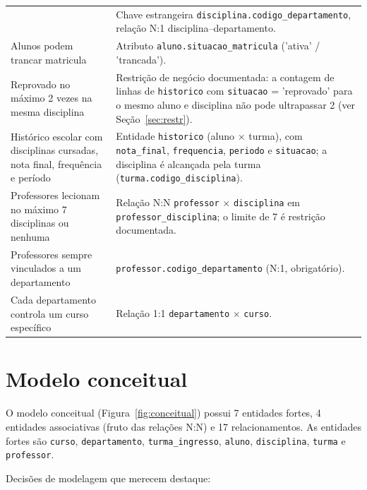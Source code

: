 \documentclass[12pt,a4paper]{article}
\begin{document}
\begin{longtable}{@{}p{}p{}@{}}
& Chave estrangeira \texttt{disciplina.codigo\_departamento}, relação
N:1 disciplina--departamento. \\
Alunos podem trancar matricula
& Atributo \texttt{aluno.situacao\_matricula} ('ativa' / 'trancada'). \\
Reprovado no máximo 2 vezes na mesma disciplina
& Restrição de negócio documentada: a contagem de linhas de
\texttt{historico} com \texttt{situacao} = 'reprovado' para o mesmo
aluno e disciplina não pode ultrapassar 2 (ver Seção~\ref{sec:restr}). \\
Histórico escolar com disciplinas cursadas, nota final, frequência e
período
& Entidade \texttt{historico} (aluno $\times$ turma), com
\texttt{nota\_final}, \texttt{frequencia}, \texttt{periodo} e
\texttt{situacao}; a disciplina é alcançada pela turma
(\texttt{turma.codigo\_disciplina}). \\
Professores lecionam no máximo 7 disciplinas ou nenhuma
& Relação N:N \texttt{professor} $\times$ \texttt{disciplina} em
\texttt{professor\_disciplina}; o limite de 7 é restrição documentada. \\
Professores sempre vinculados a um departamento
& \texttt{professor.codigo\_departamento} (N:1, obrigatório). \\
Cada departamento controla um curso específico
& Relação 1:1 \texttt{departamento} $\times$ \texttt{curso}. \\
\bottomrule
\end{longtable}

\section{Modelo conceitual}
\label{sec:conceitual}

O modelo conceitual (Figura~\ref{fig:conceitual}) possui 7 entidades
fortes, 4 entidades associativas (fruto das relações N:N) e 17
relacionamentos. As entidades fortes são \texttt{curso},
\texttt{departamento}, \texttt{turma\_ingresso}, \texttt{aluno},
\texttt{disciplina}, \texttt{turma} e \texttt{professor}.

Decisões de modelagem que merecem destaque:
\end{document}

